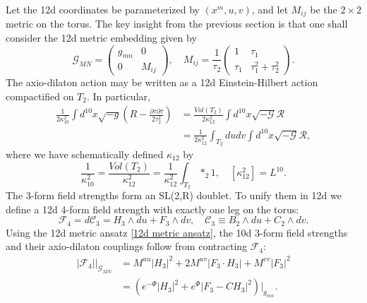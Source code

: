 Let the 12d coordinates be parameterized by $(x^m,u,v)$, and let $M_{ij}$ be the $2\times 2$ metric on the torus.
The key insight from the previous section is that one shall consider the 12d metric embedding given by
\begin{equation}
\mathcal{G}_{MN}=\begin{pmatrix}
g_{mn} & 0 \\
0 &M_{ij}
\end{pmatrix},\quad
M_{ij}
=\frac{1}{\tau_2}\begin{pmatrix}
1& \tau_1\\
\tau_1 & \tau_1^2+\tau_2^2
\end{pmatrix}.
\label{12d metric ansatz}
\end{equation}
The axio-dilaton action may be written as a 12d Einstein-Hilbert action compactified on $T_2$. In particular,
\begin{equation}
\begin{aligned}
\frac{1}{2\kappa_{10}^2}\int d^{10}x\sqrt{-g}\left(
R - \frac{\partial\tau \partial\bar\tau}{2\tau_2^2}
\right)
&=
\frac{Vol(T_2)}{2\kappa_{12}^2}\int d^{10}x \sqrt{-\mathcal{G}} \mathcal{R}\\
&=\frac{1}{2\kappa_{12}^2}\int_{T_2}dudv\int d^{10}x\sqrt{-\mathcal G}\mathcal{R},
\end{aligned}
\label{axio-dilaton 12d uplift}
\end{equation}
where we have schematically defined $\kappa_{12}$ by 
\begin{equation}
\frac{1}{\kappa_{10}^2} = \frac{Vol(T_2)}{\kappa_{12}^2}
=\frac{1}{\kappa_{12}^2}\int_{T_2}*_2 1,\quad
[\kappa_{12}^2] = L^{10}.
\end{equation}
The 3-form field strengths form an SL(2,R) doublet. 
To unify them in 12d we define a 12d 4-form field strength with exactly one leg on the torus:
\begin{equation}
\mathcal{F}_4=d\mathcal C_3 = H_3\wedge du + F_3\wedge dv,\quad
\mathcal C_3 \equiv B_2\wedge du + C_2\wedge dv.
\end{equation}
Using the 12d metric ansatz \eqref{12d metric ansatz}, the 10d 3-form field strengths and their axio-dilaton couplings follow from contracting $\mathcal F_4$:
\begin{equation}
\begin{aligned}
|\mathcal F_4|\bigg|_{\mathcal{G}_{MN}}
&=M^{uu}|H_3|^2+2M^{uv}|F_3\cdot H_3|+M^{vv}|F_3|^2\\
&=\left(
e^{-\Phi}|H_3|^2 + e^\Phi|F_3-CH_3|^2
\right)\bigg|_{g_{mn}}.
\end{aligned}
\end{equation}
